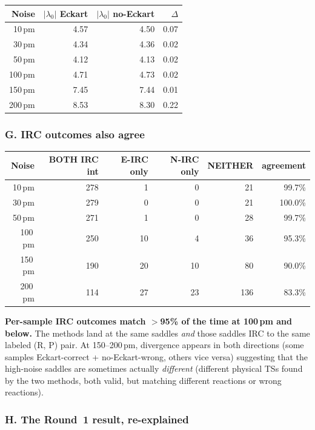 \documentclass[11pt]{article}
\begin{document}
\begin{center}
\begin{tabular}{rrrr}
\toprule
Noise & $|\lambda_0|$ Eckart & $|\lambda_0|$ no-Eckart & $\Delta$ \\
\midrule
10\,pm  & 4.57 & 4.50 & 0.07 \\
30\,pm  & 4.34 & 4.36 & 0.02 \\
50\,pm  & 4.12 & 4.13 & 0.02 \\
100\,pm & 4.71 & 4.73 & 0.02 \\
150\,pm & 7.45 & 7.44 & 0.01 \\
200\,pm & 8.53 & 8.30 & 0.22 \\
\bottomrule
\end{tabular}
\end{center}

\subsubsection*{G. IRC outcomes also agree}

\begin{center}
\begin{tabular}{rrrrrr}
\toprule
Noise & BOTH IRC int & E-IRC only & N-IRC only & NEITHER & agreement \\
\midrule
10\,pm  & 278 & 1  & 0  & 21  & 99.7\% \\
30\,pm  & 279 & 0  & 0  & 21  & 100.0\% \\
50\,pm  & 271 & 1  & 0  & 28  & 99.7\% \\
100\,pm & 250 & 10 & 4  & 36  & 95.3\% \\
150\,pm & 190 & 20 & 10 & 80  & 90.0\% \\
200\,pm & 114 & 27 & 23 & 136 & 83.3\% \\
\bottomrule
\end{tabular}
\end{center}

\textbf{Per-sample IRC outcomes match $>$95\% of the time at 100\,pm and
below.} The methods land at the same saddles \emph{and} those saddles
IRC to the same labeled (R, P) pair. At 150--200\,pm, divergence
appears in both directions (some samples Eckart-correct + no-Eckart-wrong,
others vice versa) suggesting that the high-noise saddles are sometimes
actually \emph{different} (different physical TSs found by the two
methods, both valid, but matching different reactions or wrong reactions).

\subsubsection*{H. The Round~1 result, re-explained}
\end{document}

